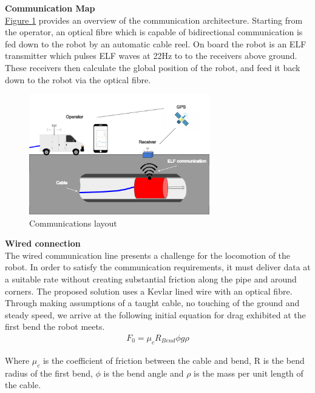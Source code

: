 \documentclass[11pt]{article}		%
\newcommand{\figref}[1]{\hyperref[#1]{Figure \ref*{#1}}}    %
\begin{document}
	        \textbf{Communication Map}
	        \\
	        \figref{commsLayout} provides an overview of the communication architecture. 
	        Starting from the operator, an optical fibre which is capable of bidirectional communication is fed down to the robot by an automatic cable reel. 
	        On board the robot is an ELF transmitter which pulses ELF waves at 22Hz to to the receivers above ground. 
	        These receivers then calculate the global position of the robot, and feed it back down to the robot via the optical fibre.
	        \\
	        \begin{figure}[h]
				\centering
				\includegraphics[width=0.7\textwidth]{comms layout}
				\caption{Communications layout}
				\label{commsLayout}
			\end{figure}
			
            \textbf{Wired connection}
	        \\
	        The wired communication line presents a challenge for the locomotion of the robot. 
	        In order to satisfy the communication requirements, it must deliver data at a suitable rate without creating substantial friction along the pipe and around corners. 
	        The proposed solution uses a Kevlar lined wire with an optical fibre. 
	        Through making assumptions of a taught cable, no touching of the ground and steady speed, we arrive at the following initial equation for drag exhibited at the first bend the robot meets. 
	        \begin{align}
					F_0 = \mu_c R_{Bend} \phi   g \rho
			\end{align}
	        
	        Where $\mu_c$ is the coefficient of friction between the cable and bend, R is the bend radius of the first bend, $\phi$ is the bend angle and $\rho$ is the mass per unit length of the cable.
	        
\end{document}
